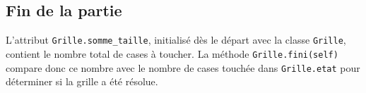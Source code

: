 \subsection{Fin de la partie}
L'attribut \texttt{Grille.somme\_taille}, initialisé dès le départ avec la classe \texttt{Grille}, contient le nombre total de cases à toucher. La méthode \texttt{Grille.fini(self)} compare donc ce nombre avec le nombre de cases touchée dans \texttt{Grille.etat} pour déterminer si la grille a été résolue.